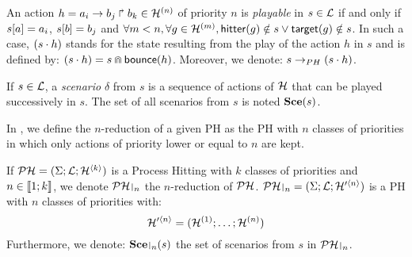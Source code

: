 \begin{definition}
\label{def:play}
  An action $h = a_i\rightarrow b_j\Rsh b_k \in \mathcal{H}^{(n)}$ of priority $n$ is \emph{playable} in $s \in \mathcal{L}$
  if and only if ${s[a]} = a_i$, ${s[b]} = b_j$ and $\forall m < n, \forall g \in \mathcal{H}^{(m)}, \mathsf{hitter}(g) \notin s \vee \mathsf{target}(g) \notin s$.
  In such a case, $(s \cdot h)$ stands for the state resulting from the play of the action $h$ in $s$ and is defined by: $(s \cdot h) = s \Cap \mathsf{bounce}(h)$.
  Moreover, we denote: $s \rightarrow_{PH} (s \cdot h)$.

  If $s \in \mathcal{L}$,
  a \emph{scenario} $\delta$ from $s$ is a sequence of actions of $\mathcal{H}$ that can be played successively in $s$.
  The set of all scenarios from $s$ is noted $\mathbf{Sce}(s)$.
\end{definition}

In , we define the $n$-reduction of a given PH as the PH with $n$ classes of priorities in which only actions of priority lower or equal to $n$ are kept.
\begin{definition}[PH $n$-reduction] %
\label{def:restriction}
  If $\mathcal{PH} = (\Sigma; \mathcal{L}; \mathcal{H}^{\langle k \rangle})$ is a Process Hitting with $k$ classes of priorities and $n \in \llbracket 1; k \rrbracket$, we denote $\restriction{\PH}{n}$ %
  the $n$-reduction of $\mathcal{PH}$.
  $\restriction{\PH}{n} = (\PHs; \PHl; \PHa'^{\langle n \rangle})$ is a PH with $n$ classes of priorities with:
  $$\mathcal{H}'^{\langle n \rangle} = (\mathcal{H}^{(1)}; \dots; \mathcal{H}^{(n)})$$
  Furthermore, we denote: $\restriction{\Sce}{n}(s)$ the set of scenarios from $s$ in $\restriction{\PH}{n}$.
\end{definition}



